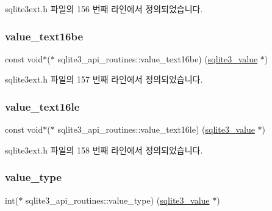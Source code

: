 sqlite3ext.\+h 파일의 156 번째 라인에서 정의되었습니다.

\mbox{\label{structsqlite3__api__routines_af21386f3f28a2deefa8fe73d07c6f7ca}} 
\subsubsection{\texorpdfstring{value\+\_\+text16be}{value\_text16be}}
{\footnotesize\ttfamily const void$\ast$($\ast$ sqlite3\+\_\+api\+\_\+routines\+::value\+\_\+text16be) (\hyperlink{sqlite3_8h_ac2fa1ecdb2290d9af6010edbd1cbc83c}{sqlite3\+\_\+value} $\ast$)}



sqlite3ext.\+h 파일의 157 번째 라인에서 정의되었습니다.

\mbox{\label{structsqlite3__api__routines_a1a99f053ce6183ec8fcb007e7b66a43c}} 
\subsubsection{\texorpdfstring{value\+\_\+text16le}{value\_text16le}}
{\footnotesize\ttfamily const void$\ast$($\ast$ sqlite3\+\_\+api\+\_\+routines\+::value\+\_\+text16le) (\hyperlink{sqlite3_8h_ac2fa1ecdb2290d9af6010edbd1cbc83c}{sqlite3\+\_\+value} $\ast$)}



sqlite3ext.\+h 파일의 158 번째 라인에서 정의되었습니다.

\mbox{\label{structsqlite3__api__routines_a30e5d5464fae02a66e73c0ee6afa3a0d}} 
\subsubsection{\texorpdfstring{value\+\_\+type}{value\_type}}
{\footnotesize\ttfamily int($\ast$ sqlite3\+\_\+api\+\_\+routines\+::value\+\_\+type) (\hyperlink{sqlite3_8h_ac2fa1ecdb2290d9af6010edbd1cbc83c}{sqlite3\+\_\+value} $\ast$)}



